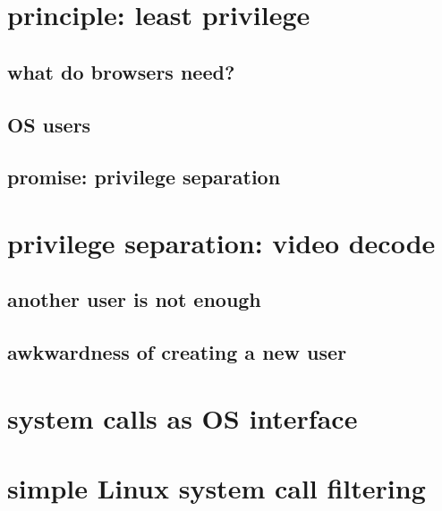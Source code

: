 \graphicspath{{./figures/}}
\usepackage[outputdir=latex.out]{minted}
\title{}
\date{}

\begin{frame}
    \titlepage
\end{frame}



\section{principle: least privilege}


\subsection{what do browsers need?}


\subsection{OS users}


\subsection{promise: privilege separation}


\section{privilege separation: video decode}


\subsection{another user is not enough}


\subsection{awkwardness of creating a new user}


\section{system calls as OS interface}


\section{simple Linux system call filtering}


